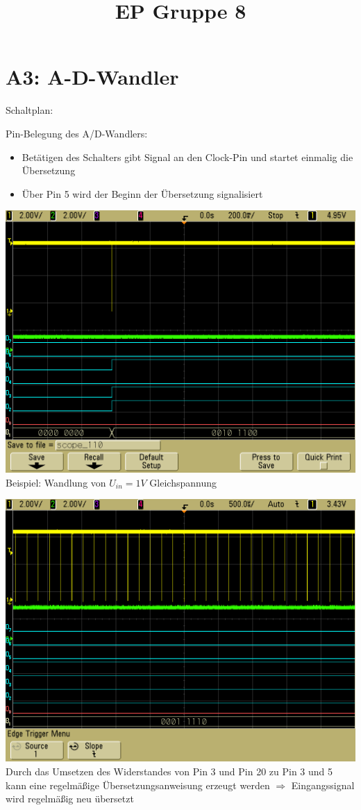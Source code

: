 \documentclass[compress,11pt]{beamer}
\title{EP Gruppe 8}
\begin{document}
\section{A3: A-D-Wandler}
\begin{frame}
Schaltplan:




\end{frame}
\begin{frame}
Pin-Belegung des A/D-Wandlers:\\



\begin{itemize}

\item Betätigen des Schalters gibt Signal an den Clock-Pin und startet einmalig die Übersetzung
\item Über Pin 5 wird der Beginn der Übersetzung signalisiert
\end{itemize}
\end{frame}
\begin{frame}
\includegraphics[width=.7\textwidth]{../vales_zeug/scope_110}\\
Beispiel: Wandlung von $U_{in} = 1 V$ Gleichspannung
\end{frame}
\begin{frame}
\includegraphics[width=.7\textwidth]{../vales_zeug/scope_114}\\
Durch das Umsetzen des Widerstandes von Pin 3 und Pin 20 zu Pin 3 und 5 kann eine regelmäßige Übersetzungsanweisung erzeugt werden $\Rightarrow$  Eingangssignal wird regelmäßig neu übersetzt
\end{frame}
\end{document}
